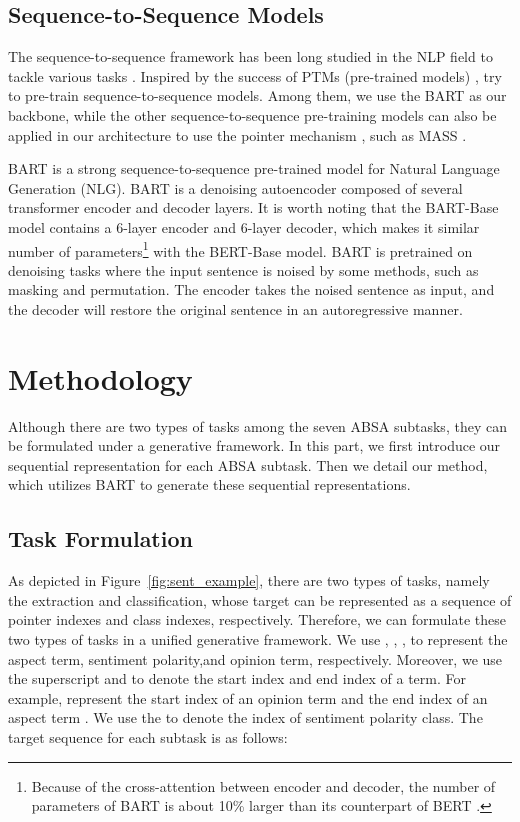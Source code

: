 \documentclass[11pt,a4paper]{article}
\begin{document}
\subsection{Sequence-to-Sequence Models}
The sequence-to-sequence framework has been long studied in the NLP field to tackle various tasks \cite{DBLP:conf/nips/SutskeverVL14,DBLP:conf/emnlp/ChoMGBBSB14,DBLP:conf/nips/VinyalsFJ15,DBLP:conf/emnlp/LuongPM15}. Inspired by the success of PTMs (pre-trained models) \cite{DBLP:journals/corr/abs-2003-08271,DBLP:conf/naacl/PetersNIGCLZ18,dblp:conf/naacl/devlinclt19,brown2020language}, \citet{DBLP:conf/icml/SongTQLL19,DBLP:journals/jmlr/RaffelSRLNMZLL20,DBLP:conf/acl/LewisLGGMLSZ20} try to pre-train sequence-to-sequence models. Among them, we use the BART \cite{DBLP:conf/acl/LewisLGGMLSZ20} as our backbone, while the other sequence-to-sequence pre-training models can also be applied in our architecture to use the pointer mechanism \cite{DBLP:conf/nips/VinyalsFJ15}, such as MASS \cite{DBLP:conf/icml/SongTQLL19}.

BART is a strong sequence-to-sequence pre-trained model for Natural Language Generation (NLG). BART is a denoising autoencoder composed of several transformer \cite{dblp:conf/nips/vaswanispujgkp17} encoder and decoder layers. It is worth noting that the BART-Base model contains a 6-layer encoder and 6-layer decoder, which makes it similar number of parameters\footnote{Because of the cross-attention between encoder and decoder, the number of parameters of BART is about 10\% larger than its counterpart of BERT \cite{DBLP:conf/acl/LewisLGGMLSZ20}.} with the BERT-Base model.  BART is pretrained on denoising tasks where the input sentence is noised by some methods, such as masking and permutation.  The encoder takes the noised sentence as input, and the decoder will restore the original sentence in an autoregressive manner.


\section{Methodology}
Although there are two types of tasks among the seven ABSA subtasks, they can be formulated under a generative framework. In this part, we first introduce our sequential representation for each ABSA subtask. Then we detail our method, which utilizes  BART to generate these sequential representations.

\subsection{Task Formulation}
As depicted in Figure~\ref{fig:sent_example}, there are two types of tasks, namely the extraction and classification, whose target can be represented as a sequence of pointer indexes and class indexes, respectively. Therefore, we can formulate these two types of tasks in a unified generative framework. We use  , , , to represent the  aspect term, sentiment polarity,and opinion term, respectively. Moreover, we use the superscript  and  to denote the start index and end index of a term. For example,  represent the start index of an opinion term  and the end index of an aspect term . We use the  to denote the index of sentiment polarity class. The target sequence for each subtask is as follows:
\end{document}

